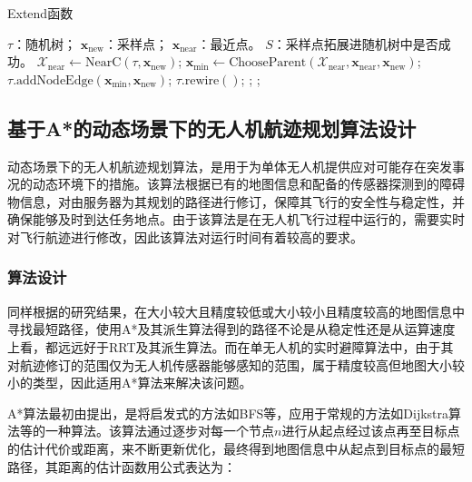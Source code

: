 \begin{algorithm}[!htbp]
  \caption{Extend函数} %
  \label{alg:extend_function}
  \begin{algorithmic}[1]
    \REQUIRE 
        \( \tau \)：随机树；
        \( \boldsymbol{x}_{\textrm{new}} \)：采样点；
        \( \boldsymbol{x}_{\textrm{near}} \)：最近点。
    \ENSURE 
        \( S \)：采样点拓展进随机树中是否成功。
        \STATE \(\mathcal{X}_\textrm{near} \gets \textrm{NearC}(\tau, \boldsymbol{x}_{\textrm{new}}) \);
        \STATE \( \boldsymbol{x}_{\textrm{min}} \gets \textrm{ChooseParent}(\mathcal{X}_{\textrm{near}}, \boldsymbol{x}_{\textrm{near}}, \boldsymbol{x}_{\textrm{new}}) \);
        \STATE \( \tau.\textrm{addNodeEdge}(\boldsymbol{x}_{\textrm{min}}, \boldsymbol{x}_{\textrm{new}}) \);
        \STATE \( \tau.\textrm{rewire}() \);
        \RETURN \TRUE;
    \ENDIF
    \RETURN \FALSE;
  \end{algorithmic}
\end{algorithm}

\subsection{基于A*的动态场景下的无人机航迹规划算法设计}

动态场景下的无人机航迹规划算法，是用于为单体无人机提供应对可能存在突发事况的动态环境下的措施。该算法根据已有的地图信息和配备的传感器探测到的障碍物信息，对由服务器为其规划的路径进行修订，保障其飞行的安全性与稳定性，并确保能够及时到达任务地点。由于该算法是在无人机飞行过程中运行的，需要实时对飞行航迹进行修改，因此该算法对运行时间有着较高的要求。

\subsubsection{算法设计}

同样根据\citet{braun2019ComparisonRRTAlgorithmsa}的研究结果，在大小较大且精度较低或大小较小且精度较高的地图信息中寻找最短路径，使用A*及其派生算法得到的路径不论是从稳定性还是从运算速度上看，都远远好于RRT及其派生算法。而在单无人机的实时避障算法中，由于其对航迹修订的范围仅为无人机传感器能够感知的范围，属于精度较高但地图大小较小的类型，因此适用A*算法来解决该问题。

A*算法最初由\citet{hart1968FormalBasisHeuristica}提出，是将启发式的方法如BFS等，应用于常规的方法如Dijkstra算法等的一种算法。该算法通过逐步对每一个节点\( n \)进行从起点经过该点再至目标点的估计代价或距离，来不断更新优化，最终得到地图信息中从起点到目标点的最短路径，其距离的估计函数用公式表达为：

